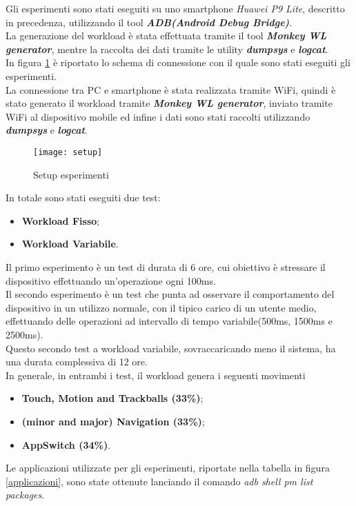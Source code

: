 Gli esperimenti sono stati eseguiti su uno smartphone \textit{Huawei P9 Lite}, descritto
in precedenza, utilizzando il tool \textit{\textbf{ADB(Android Debug Bridge)}}.\\
La generazione del workload è stata effettuata tramite il tool
\textit{\textbf{Monkey WL generator}}, mentre la raccolta dei dati tramite le
utility \textit{\textbf{dumpsys}} e \textit{\textbf{logcat}}.\\
In figura \ref{setup} è riportato lo schema di connessione con il quale sono stati
eseguiti gli esperimenti.\\
La connessione tra PC e smartphone è stata realizzata tramite WiFi, quindi è
stato generato il workload tramite \textit{\textbf{Monkey WL generator}}, inviato
tramite WiFi al dispositivo mobile ed infine i dati sono stati raccolti
utilizzando \textit{\textbf{dumpsys}} e \textit{\textbf{logcat}}.\\

\begin{figure}[!htbp]
  \centering
  \texttt{[image: setup]}
  \caption{Setup esperimenti}
  \label{setup}
\end{figure}

In totale sono stati eseguiti due test:
\begin{itemize}
  \item \textbf{Workload Fisso};
  \item \textbf{Workload Variabile}.
\end{itemize}

Il primo esperimento è un test di durata di 6 ore, cui obiettivo è stressare il
dispositivo effettuando un'operazione ogni 100ms.\\
Il secondo esperimento è un test che punta ad osservare il comportamento del dispositivo
in un utilizzo normale, con il tipico carico di un utente medio, effettuando
delle operazioni ad intervallo di tempo variabile(500ms, 1500ms e 2500ms).\\
Questo secondo test a workload variabile, sovraccaricando meno il sistema, ha una
durata complessiva di 12 ore.\\
In generale, in entrambi i test, il workload genera i seguenti movimenti
\begin{itemize}
  \item \textbf{Touch, Motion and Trackballs (33\%)};
  \item \textbf{(minor and major) Navigation (33\%)};
  \item \textbf{AppSwitch (34\%)}.
\end{itemize}
Le applicazioni utilizzate per gli esperimenti, riportate nella tabella in figura
\ref{applicazioni}, sono state ottenute lanciando il comando
\textit{adb shell pm list packages}.\\

